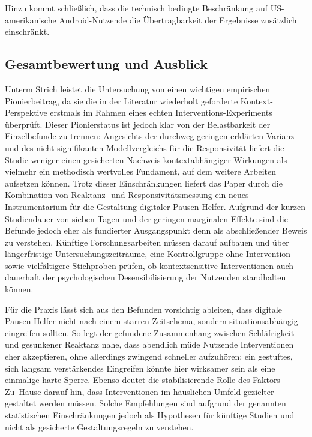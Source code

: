 \documentclass[11pt,a4paper]{article}
\begin{document}
Hinzu kommt schließlich, dass die technisch bedingte Beschränkung auf US-amerikanische
Android-Nutzende die Übertragbarkeit der Ergebnisse zusätzlich einschränkt.

\subsection{Gesamtbewertung und Ausblick}

Unterm Strich leistet die Untersuchung von \citet{meinhardt2025scrolling} einen wichtigen
empirischen Pionierbeitrag, da sie die in der Literatur wiederholt geforderte
Kontext-Perspektive erstmals im Rahmen eines echten Interventions-Experiments überprüft.
Dieser Pionierstatus ist jedoch klar von der Belastbarkeit der Einzelbefunde zu trennen:
Angesichts der durchweg geringen erklärten Varianz und des nicht signifikanten
Modellvergleichs für die Responsivität liefert die Studie weniger einen gesicherten Nachweis
kontextabhängiger Wirkungen als vielmehr ein methodisch wertvolles Fundament, auf dem
weitere Arbeiten aufsetzen können.
Trotz dieser Einschränkungen liefert das Paper durch die Kombination von Reaktanz- und
Responsivitätsmessung ein neues Instrumentarium für die Gestaltung digitaler
Pausen-Helfer. Aufgrund der kurzen Studiendauer von sieben Tagen und der geringen
marginalen Effekte sind die Befunde jedoch eher als fundierter Ausgangspunkt denn als
abschließender Beweis zu verstehen. Künftige Forschungsarbeiten müssen darauf aufbauen und
über längerfristige Untersuchungszeiträume, eine Kontrollgruppe ohne Intervention sowie
vielfältigere Stichproben prüfen, ob
kontextsensitive Interventionen auch dauerhaft der psychologischen Desensibilisierung der
Nutzenden standhalten können.

Für die Praxis lässt sich aus den Befunden vorsichtig ableiten, dass digitale Pausen-Helfer
nicht nach einem starren Zeitschema, sondern situationsabhängig eingreifen sollten. So legt
der gefundene Zusammenhang zwischen Schläfrigkeit und gesunkener Reaktanz nahe, dass abendlich
müde Nutzende Interventionen eher akzeptieren, ohne allerdings zwingend schneller aufzuhören; ein
gestuftes, sich langsam verstärkendes Eingreifen könnte hier wirksamer sein als eine einmalige
harte Sperre. Ebenso deutet die stabilisierende Rolle des Faktors Zu~Hause darauf hin, dass
Interventionen im häuslichen Umfeld gezielter gestaltet werden müssen. Solche Empfehlungen sind
aufgrund der genannten statistischen Einschränkungen jedoch als Hypothesen für künftige
Studien und nicht als gesicherte Gestaltungsregeln zu verstehen.
\end{document}
